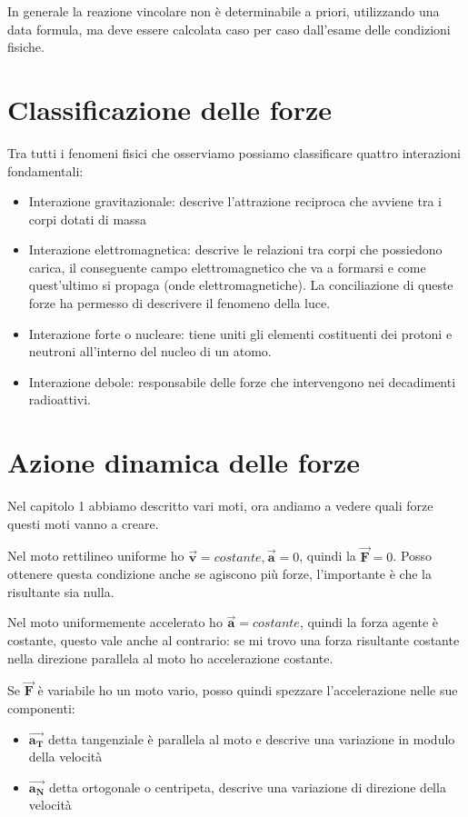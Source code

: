 \documentclass[class=book, crop=false, oneside, 12pt]{standalone}
\begin{document}
In generale la reazione vincolare non è determinabile a priori, utilizzando una data formula, ma deve essere calcolata caso per caso dall'esame delle condizioni fisiche. 

\section{Classificazione delle forze}

Tra tutti i fenomeni fisici che osserviamo possiamo classificare quattro interazioni fondamentali:
\begin{itemize}
    \item Interazione gravitazionale: descrive l'attrazione reciproca che avviene tra i corpi dotati di massa
    \item Interazione elettromagnetica: descrive le relazioni tra corpi che possiedono carica, il conseguente campo elettromagnetico che va a formarsi e come quest'ultimo si propaga (onde elettromagnetiche). La conciliazione di queste forze ha permesso di descrivere il fenomeno della luce.
    \item Interazione forte o nucleare: tiene uniti gli elementi costituenti dei protoni e neutroni all'interno del nucleo di un atomo. 
    \item Interazione debole: responsabile delle forze che intervengono nei decadimenti radioattivi.
\end{itemize}

\section{Azione dinamica delle forze}

Nel capitolo 1 abbiamo descritto vari moti, ora andiamo a vedere quali forze questi moti vanno a creare.

Nel moto rettilineo uniforme ho \(\overrightarrow{\mathbf{v}} = costante, \overrightarrow{\mathbf{a}} = 0\), quindi la \(\overrightarrow{\mathbf{F}} = 0\).
Posso ottenere questa condizione anche se agiscono più forze, l'importante è che la risultante sia nulla.

Nel moto uniformemente accelerato ho \(\overrightarrow{\mathbf{a}} = costante\), quindi la forza agente è costante, 
questo vale anche al contrario: se mi trovo una forza risultante costante nella direzione parallela al moto ho accelerazione costante.

Se \(\overrightarrow{\mathbf{F}}\) è variabile ho un moto vario, posso quindi spezzare l'accelerazione nelle sue componenti:
\begin{itemize}
    \item \(\overrightarrow{\mathbf{a_T}}\) detta tangenziale è parallela al moto e descrive una variazione in modulo della velocità
    \item \(\overrightarrow{\mathbf{a_N}}\) detta ortogonale o centripeta, descrive una variazione di direzione della velocità
\end{itemize}
\end{document}
